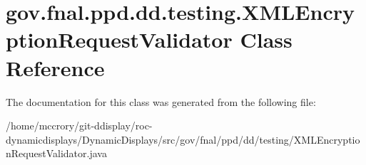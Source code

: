 \hypertarget{classgov_1_1fnal_1_1ppd_1_1dd_1_1testing_1_1XMLEncryptionRequestValidator}{\section{gov.\-fnal.\-ppd.\-dd.\-testing.\-X\-M\-L\-Encryption\-Request\-Validator Class Reference}
\label{classgov_1_1fnal_1_1ppd_1_1dd_1_1testing_1_1XMLEncryptionRequestValidator}
}


The documentation for this class was generated from the following file\-:\begin{DoxyCompactItemize}
\item 
/home/mccrory/git-\/ddisplay/roc-\/dynamicdisplays/\-Dynamic\-Displays/src/gov/fnal/ppd/dd/testing/X\-M\-L\-Encryption\-Request\-Validator.\-java\end{DoxyCompactItemize}
